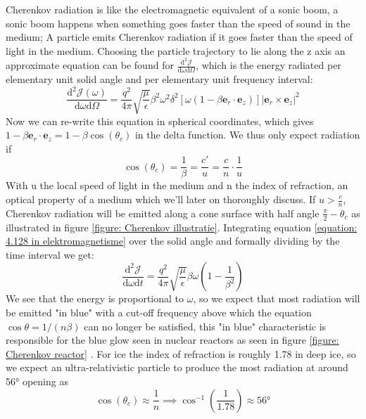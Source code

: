 \documentclass[11pt,a4paper,faculty=we,language=en,doctype=report]{cls/ugent-doc}
\begin{document}
Cherenkov radiation is like the electromagnetic equivalent of a sonic boom, a
sonic boom happens when something goes faster than the speed of sound in the
medium; A particle emits Cherenkov radiation if it goes faster than the speed
of light in the medium.  Choosing the particle trajectory to lie along the z
axis an approximate equation can be found\cite{jackson1998classical} for
$\frac{\text{d}^2 \mathscr{J}}{\text{d}\omega \text{d}\Omega}$, which is the energy
radiated per elementary unit solid angle and per elementary unit frequency
interval:
\begin{equation}
	\frac{\text{d}^2 \mathscr{J}(\omega)}{\text{d} \omega \text{d} \Omega} = \frac{q^2}{4\pi}\sqrt{\frac{\mu}{\epsilon}}\beta^2\omega^2\delta^2[\omega(1-\beta \mathbf{e}_r\cdot\mathbf{e}_z)]|\mathbf{e}_r\times\mathbf{e}_z|^2 \label{equation: 4.128 in elektromagnetisme}
\end{equation}
Now we can re-write this equation in spherical coordinates, which gives $1-\beta \mathbf{e}_r\cdot\mathbf{e}_z = 1-\beta\cos(\theta_c)$ in the delta function. We thus only expect radiation if
\begin{equation}
\cos(\theta_c) = \frac{1}{\beta} = \frac{c'}{u} = \frac{c}{n}\cdot\frac{1}{u}
\end{equation}
With u the local speed of light in the medium and n the index of refraction, an optical
property of a medium which we'll later on thoroughly discuss.
If $u>\frac{c}{n}$, Cherenkov radiation will
be emitted along a cone surface with half angle $\frac{\pi}{2}-\theta_c$ as
illustrated in figure \ref{figure: Cherenkov illustratie}. Integrating equation
\ref{equation: 4.128 in elektromagnetisme} over the solid angle and formally
dividing by the time interval we get:
\begin{equation}
	\frac{\text{d}^2\mathscr{J}}{\text{d}\omega \text{d}t} = \frac{q^2}{4\pi}\sqrt{\frac{\mu}{\epsilon}}\beta\omega\left(1-\frac{1}{\beta^2}\right)	
\end{equation}
We see that the energy is proportional to $\omega$, so we expect that most
radiation will be emitted "in blue" with a cut-off frequency above which the
equation $\cos\theta = 1/(n\beta)$ can no longer be satisfied, this "in blue"
characteristic is responsible for the blue glow seen in nuclear reactors as
seen in figure \ref{figure: Cherenkov reactor} .  For ice the index of
refraction is roughly 1.78 in deep ice, so we expect an ultra-relativistic
particle to produce the most radiation at around 56° opening as 
\begin{equation}
	\cos(\theta_c) \approx \frac{1}{n} \implies \cos^{-1}\left(\frac{1}{1.78}\right)\approx 56\text{°}
\end{equation}
\end{document}
